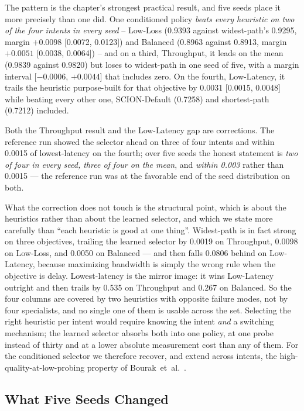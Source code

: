 The pattern is the chapter's strongest practical result, and five seeds place it more precisely than one
did. One conditioned policy \emph{beats every heuristic on two of the four intents in every seed} --
Low-Loss (0.9393 against widest-path's 0.9295, margin $+0.0098$ [0.0072, 0.0123]) and Balanced (0.8963
against 0.8913, margin $+0.0051$ [0.0038, 0.0064]) -- and on a third, Throughput, it leads on the mean
(0.9839 against 0.9820) but loses to widest-path in one seed of five, with a margin interval
[$-0.0006$, $+0.0044$] that includes zero. On the fourth, Low-Latency, it trails the heuristic
purpose-built for that objective by 0.0031 [0.0015, 0.0048] while beating every other one, SCION-Default
(0.7258) and shortest-path (0.7212) included.

Both the Throughput result and the Low-Latency gap are corrections. The reference run showed the selector
ahead on three of four intents and within 0.0015 of lowest-latency on the fourth; over five seeds the
honest statement is \emph{two of four in every seed, three of four on the mean}, and \emph{within 0.003}
rather than 0.0015 --- the reference run was at the favorable end of the seed distribution on both.

What the correction does not touch is the structural point, which is about the heuristics rather than
about the learned selector, and which we state more carefully than ``each heuristic is good at one
thing''. Widest-path is in fact strong on three objectives, trailing the learned selector by 0.0019 on
Throughput, 0.0098 on Low-Loss, and 0.0050 on Balanced --- and then falls 0.0806 behind on Low-Latency,
because maximizing bandwidth is simply the wrong rule when the objective is delay. Lowest-latency is the
mirror image: it wins Low-Latency outright and then trails by 0.535 on Throughput and 0.267 on Balanced.
So the four columns are covered by two heuristics with opposite failure modes, not by four specialists,
and no single one of them is usable across the set. Selecting
the right heuristic per intent would require knowing the intent \emph{and} a switching mechanism; the
learned selector absorbs both into one policy, at one probe instead of thirty and at a lower absolute
measurement cost than any of them. For the conditioned selector we therefore recover, and extend across
intents, the high-quality-at-low-probing property of Bourak~et~al.~\cite{Bourak2025}.

\subsection{What Five Seeds Changed}
\label{sec:p1eval:limits}

